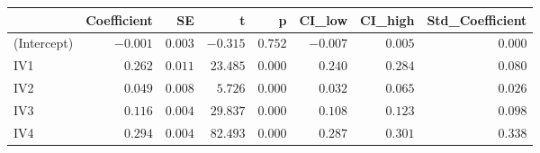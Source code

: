 \begin{longtable}{l|rr|rrrrr}
\toprule
\multicolumn{1}{l}{} & Coefficient & SE & t & p & CI\_low & CI\_high & Std\_Coefficient \\ 
\midrule
(Intercept) & $-0.001$ & $0.003$ & $-0.315$ & $0.752$ & $-0.007$ & $0.005$ & $0.000$ \\ 
IV1 & $0.262$ & $0.011$ & $23.485$ & $0.000$ & $0.240$ & $0.284$ & $0.080$ \\ 
IV2 & $0.049$ & $0.008$ & $5.726$ & $0.000$ & $0.032$ & $0.065$ & $0.026$ \\ 
IV3 & $0.116$ & $0.004$ & $29.837$ & $0.000$ & $0.108$ & $0.123$ & $0.098$ \\ 
IV4 & $0.294$ & $0.004$ & $82.493$ & $0.000$ & $0.287$ & $0.301$ & $0.338$ \\ 
\bottomrule
\end{longtable}

